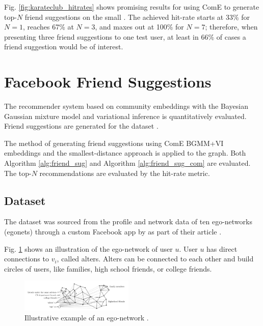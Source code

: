 \documentclass[conference]{IEEEtran}
\begin{document}
Fig. \ref{fig:karateclub_hitrates} shows promising results for using ComE to generate top-$N$ friend suggestions on the small \citet{KarateClubDS}. The achieved hit-rate starts at 33\% for $N=1$, reaches 67\% at $N=3$, and maxes out at 100\% for $N=7$; therefore, when presenting three friend suggestions to one test user, at least in $66\%$ of cases a friend suggestion would be of interest.


\section{Facebook Friend Suggestions}

The recommender system based on community embeddings with the Bayesian Gaussian mixture model and variational inference is quantitatively evaluated. Friend suggestions are generated for the \citet{social_circles_fb} dataset \cite{social_circles_fb, social_circles_in_ego_networks}.

The method of generating friend suggestions using ComE BGMM+VI embeddings and the smallest-distance approach is applied to the \citet{social_circles_fb} graph. Both Algorithm \ref{alg:friend_sug} and Algorithm \ref{alg:friend_sug_com} are evaluated. The top-$N$ recommendations are evaluated by the hit-rate metric.

\subsection{Dataset}

The \citet{social_circles_fb} dataset was sourced from the profile and network data of ten ego-networks (egonets) through a custom Facebook app by \citeauthor{social_circles_in_ego_networks} as part of their \citeyear{social_circles_in_ego_networks} article \citet{social_circles_in_ego_networks}.\cite{social_circles_in_ego_networks}

Fig. \ref{fig:egonet} shows an illustration of the ego-network of user $u$. User $u$ has direct connections to $v_i$, called alters. Alters can be connected to each other and build circles of users, like families, high school friends, or college friends.

\begin{figure}[htbp]
    \centering
    \includegraphics[width=0.48\textwidth]{images/fb/egonet.png}
    \caption{Illustrative example of an ego-network \cite{social_circles_in_ego_networks}.}
    \label{fig:egonet}
\end{figure}
\end{document}
